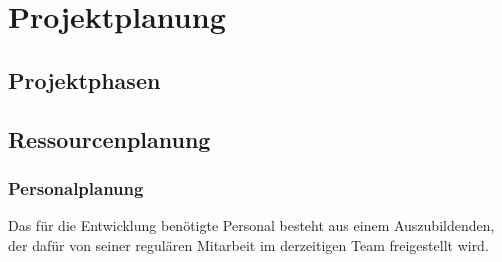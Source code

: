 \section{Projektplanung}
\label{sec:Projektplanung}


\subsection{Projektphasen}
\label{sec:Projektphasen}

%
%
%
%

\subsection{Ressourcenplanung}
\label{sec:Ressourcenplanung}
\subsubsection{Personalplanung}
\label{sec:Personalplanung}
Das für die Entwicklung benötigte Personal besteht aus einem Auszubildenden, der dafür von seiner
regulären Mitarbeit im derzeitigen Team freigestellt wird.
